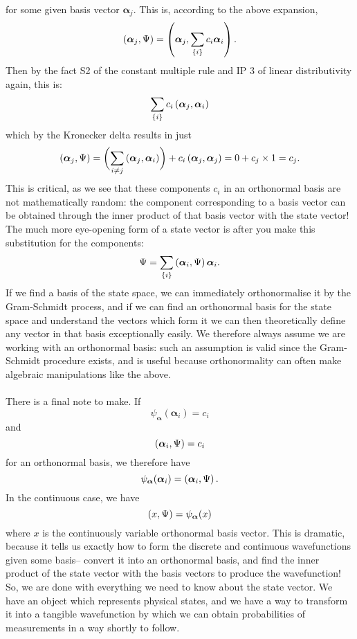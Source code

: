 for some given basis vector $\bm{\alpha}_{j}$. This is, according to the above expansion,
$$
\left(\bm{\alpha}_{j},\Psi\right)=\left(\bm{\alpha}_{j},\sum_{\{i\}}c_{i}\bm{\alpha}_{i}\right).
$$
Then by the fact S2 of the constant multiple rule and IP 3 of linear distributivity again, this is:
$$
\sum_{\{i\}}c_{i}\left(\bm{\alpha}_{j},\bm{\alpha}_{i}\right)
$$
which by the Kronecker delta results in just 
$$
\left(\bm{\alpha}_{j},\Psi\right)=\biggl(\sum_{i\neq j}\left(\bm{\alpha}_{j},\bm{\alpha}_{i}\right)\biggr)+c_{i}\left(\bm{\alpha}_{j},\bm{\alpha}_{j}\right)=0+c_{j}\times 1=c_{j}.
$$
This is critical, as we see that these components $c_{i}$ in an orthonormal basis are not mathematically random: the component corresponding to a basis vector can be obtained through the inner product of that basis vector with the state vector! The much more eye-opening form of a state vector is after you make this substitution for the components:
$$
\Psi=\sum_{\{i\}}\left(\bm{\alpha}_{i},\Psi\right)\bm{\alpha}_{i}.
$$
If we find a basis of the state space, we can immediately orthonormalise it by the Gram-Schmidt process, and if we can find an orthonormal basis for the state space and understand the vectors which form it we can then theoretically define any vector in that basis exceptionally easily. We therefore always assume we are working with an orthonormal basis: such an assumption is valid since the Gram-Schmidt procedure exists, and is useful because orthonormality can often make algebraic manipulations like the above.
\\\\
There is a final note to make. If 
$$
{\psi}_{\bm{\alpha}}(\bm{\alpha}_{i})=c_{i}
$$
and 
$$
\left(\bm{\alpha}_{i},\Psi\right)=c_{i}
$$
for an orthonormal basis, we therefore have 
$$
{\psi}_{\bm{\alpha}}(\bm{\alpha}_{i})=\left(\bm{\alpha}_{i},\Psi\right).
$$
In the continuous case, we have 
$$
\left(x,\Psi\right)=\psi_{\bm{\alpha}}(x)
$$
where $x$ is the continuously variable orthonormal basis vector. This is dramatic, because it tells us exactly how to form the discrete and continuous wavefunctions given some basis-- convert it into an orthonormal basis, and find the inner product of the state vector with the basis vectors to produce the wavefunction! So, we are done with everything we need to know about the state vector. We have an object which represents physical states, and we have a way to transform it into a tangible wavefunction by which we can obtain probabilities of measurements in a way shortly to follow.
